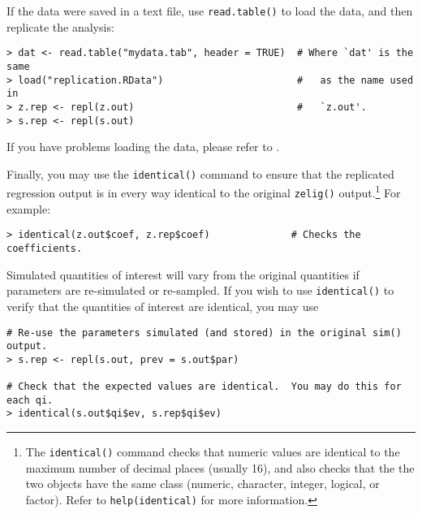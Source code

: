 If the data were saved in a text file, use {\tt read.table()} to load
the data, and then replicate the analysis:
\begin{verbatim}
> dat <- read.table("mydata.tab", header = TRUE)  # Where `dat' is the same
> load("replication.RData")                       #   as the name used in 
> z.rep <- repl(z.out)                            #   `z.out'.
> s.rep <- repl(s.out)  
\end{verbatim}
If you have problems loading the data, please refer to .

Finally, you may use the {\tt identical()} command to ensure that the
replicated regression output is in every way identical to the original
{\tt zelig()} output.\footnote{The {\tt identical()} command checks
  that numeric values are identical to the maximum number of decimal
  places (usually 16), and also checks that the the two objects have
  the same class (numeric, character, integer, logical, or factor).
  Refer to {\tt help(identical)} for more information.}  For example:
\begin{verbatim}
> identical(z.out$coef, z.rep$coef)              # Checks the coefficients.
\end{verbatim}
Simulated quantities of interest will vary from the original
quantities if parameters are re-simulated or re-sampled.  If you wish to
use {\tt identical()} to verify that the quantities of interest are
identical, you may use
\begin{verbatim}
# Re-use the parameters simulated (and stored) in the original sim() output.
> s.rep <- repl(s.out, prev = s.out$par) 

# Check that the expected values are identical.  You may do this for each qi.
> identical(s.out$qi$ev, s.rep$qi$ev) 
\end{verbatim} %



